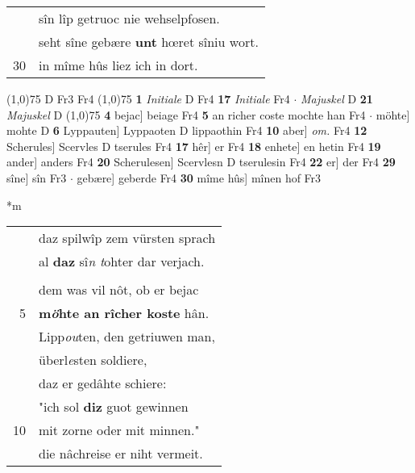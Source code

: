 \documentclass[8pt,a4paper,notitlepage]{article}
\begin{document}
\begin{table}[ht]
\begin{minipage}[t]{0.5\linewidth}
\begin{tabular}{rl}
 & sîn lîp getruoc nie wehselpfosen.\\ 
 & seht sîne gebære \textbf{unt} hœret sîniu wort.\\ 
30 & in mîme hûs liez ich in dort.\\ 
\end{tabular}
\scriptsize
\line(1,0){75} \newline
D Fr3 Fr4 \newline
\line(1,0){75} \newline
\textbf{1} \textit{Initiale} D Fr4  \textbf{17} \textit{Initiale} Fr4   $\cdot$ \textit{Majuskel} D  \textbf{21} \textit{Majuskel} D  \newline
\line(1,0){75} \newline
\textbf{4} bejac] beiage Fr4 \textbf{5} an richer coste mochte han Fr4  $\cdot$ möhte] mohte D \textbf{6} Lyppauten] Lyppaoten D lippaothin Fr4 \textbf{10} aber] \textit{om.} Fr4 \textbf{12} Scherules] Scervles D tserules Fr4 \textbf{17} hêr] er Fr4 \textbf{18} enhete] en hetin Fr4 \textbf{19} ander] anders Fr4 \textbf{20} Scherulesen] Scervlesn D tserulesin Fr4 \textbf{22} er] der Fr4 \textbf{29} sîne] sîn Fr3  $\cdot$ gebære] geberde Fr4 \textbf{30} mîme hûs] mînen hof Fr3 \newline
\end{minipage}
\hspace{0.5cm}
\begin{minipage}[t]{0.5\linewidth}
\small
\begin{center}*m
\end{center}
\begin{tabular}{rl}
 & daz spilwîp zem vürsten sprach\\ 
 & al \textbf{daz} sî\textit{n t}ohter dar verjach.\\ 
 & \textbf{\begin{large}D\end{large}er} ie urliuges \textbf{gepflac},\\ 
 & dem was vil nôt, ob er bejac\\ 
5 & \textbf{m\textit{ö}hte an rîcher koste} hân.\\ 
 & Lipp\textit{ou}ten, den getriuwen man,\\ 
 & überl\textit{e}sten soldiere,\\ 
 & daz er gedâhte schiere:\\ 
 & "ich sol \textbf{diz} guot gewinnen\\ 
10 & mit zorne oder mit minnen."\\ 
 & die nâchreise er niht vermeit.\\ 

\end{tabular}
\end{minipage}
\end{table}
\end{document}
